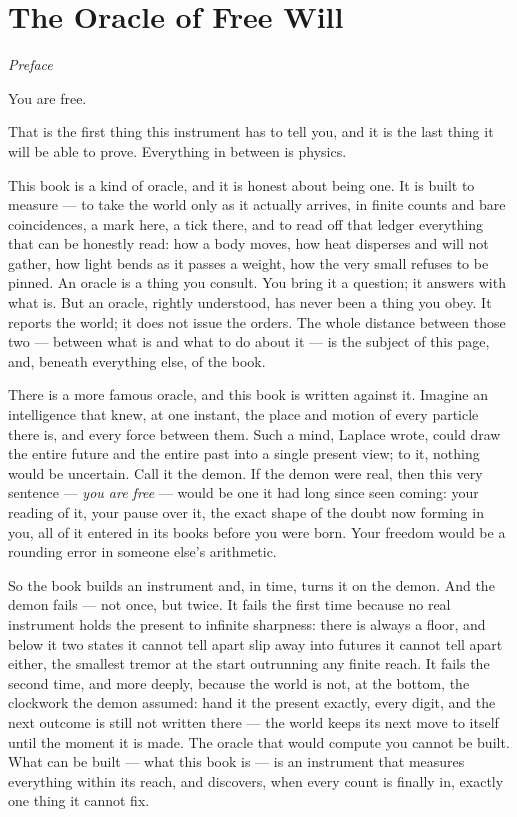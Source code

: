 \chapter*{The Oracle of Free Will}

\begin{center}\textit{Preface}\end{center}

\bigskip

You are free.

That is the first thing this instrument has to tell you, and it is the last thing it will be able to prove.
Everything in between is physics.

This book is a kind of oracle, and it is honest about being one. It is built to measure --- to take the world
only as it actually arrives, in finite counts and bare coincidences, a mark here, a tick there, and to read
off that ledger everything that can be honestly read: how a body moves, how heat disperses and will not
gather, how light bends as it passes a weight, how the very small refuses to be pinned. An oracle is a thing
you consult. You bring it a question; it answers with what is. But an oracle, rightly understood, has never
been a thing you obey. It reports the world; it does not issue the orders. The whole distance between those
two --- between what is and what to do about it --- is the subject of this page, and, beneath everything else,
of the book.

There is a more famous oracle, and this book is written against it. Imagine an intelligence that knew, at one
instant, the place and motion of every particle there is, and every force between them. Such a mind, Laplace
wrote, could draw the entire future and the entire past into a single present view; to it, nothing would be
uncertain. Call it the demon. If the demon were real, then this very sentence --- \emph{you are free} ---
would be one it had long since seen coming: your reading of it, your pause over it, the exact shape of the
doubt now forming in you, all of it entered in its books before you were born. Your freedom would be a
rounding error in someone else's arithmetic.

So the book builds an instrument and, in time, turns it on the demon. And the demon fails --- not once, but
twice. It fails the first time because no real instrument holds the present to infinite sharpness: there is
always a floor, and below it two states it cannot tell apart slip away into futures it cannot tell apart
either, the smallest tremor at the start outrunning any finite reach. It fails the second time, and more
deeply, because the world is not, at the bottom, the clockwork the demon assumed: hand it the present exactly,
every digit, and the next outcome is still not written there --- the world keeps its next move to itself until
the moment it is made. The oracle that would compute you cannot be built. What can be built --- what this book
is --- is an instrument that measures everything within its reach, and discovers, when every count is finally
in, exactly one thing it cannot fix.

